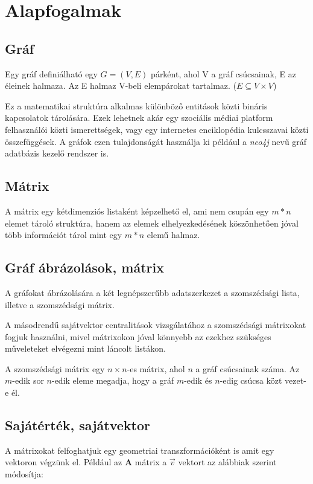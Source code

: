 \documentclass[12pt,numbers=noenddot]{report}
\begin{document}
\chapter{Alapfogalmak}
\pagestyle{fancy}

\section{Gráf}

Egy gráf definiálható egy $G=(V,E)$ párként, ahol V a gráf csúcsainak, E az 
éleinek halmaza. Az E halmaz V-beli elempárokat tartalmaz. \cite{graph-def}
($E \subseteq V \times V$)

Ez a matematikai struktúra alkalmas különböző entitások közti bináris kapcsolatok 
tárolására. Ezek lehetnek akár egy szociális médiai platform felhasználói közti 
ismerettségek, vagy egy internetes enciklopédia kulcsszavai közti összefüggések. 
A gráfok ezen tulajdonságát használja ki például a \textit{neo4j} nevű gráf 
adatbázis kezelő rendszer is.

\section{Mátrix}
A mátrix egy kétdimenziós listaként képzelhető el, ami nem csupán egy $m * n$ 
elemet tároló struktúra, hanem az elemek elhelyezkedésének köszönhetően jóval 
több információt tárol mint egy $m * n$ elemű halmaz.

\section{Gráf ábrázolások, mátrix}
A gráfokat ábrázolására a két legnépszerűbb adatszerkezet a szomszédsági lista, 
illetve a szomszédsági mátrix.

A másodrendű sajátvektor centralitások vizsgálatához a szomszédsági mátrixokat 
fogjuk használni, mivel mátrixokon jóval könnyebb az ezekhez szükséges 
műveleteket elvégezni mint láncolt listákon.

A szomszédsági mátrix egy $n \times n$-es mátrix, ahol $n$ a gráf csúcsainak 
száma. Az $m$-edik sor $n$-edik eleme megadja, hogy a gráf $m$-edik és 
$n$-edig csúcsa közt vezet-e él.


\pagebreak

\section{Sajátérték, sajátvektor}
A mátrixokat felfoghatjuk egy geometriai transzformációként is amit egy vektoron 
végzünk el. Például az $\textbf{A}$  mátrix a $\vec{v}$ vektort az alábbiak 
szerint módosítja:
\end{document}
